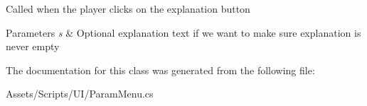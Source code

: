 Called when the player clicks on the explanation button 


\begin{DoxyParams}{Parameters}
{\em s} & Optional explanation text if we want to make sure explanation is never empty\\
\hline
\end{DoxyParams}


The documentation for this class was generated from the following file\-:\begin{DoxyCompactItemize}
\item 
Assets/\-Scripts/\-U\-I/Param\-Menu.\-cs\end{DoxyCompactItemize}
